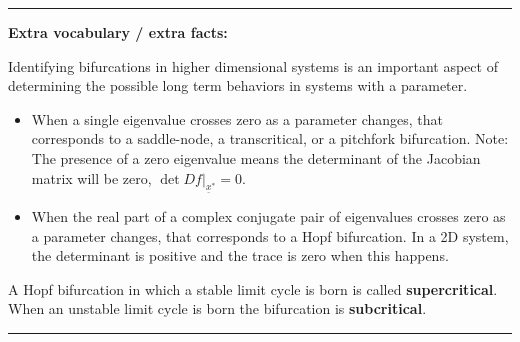 \documentclass[12pt,letterpaper,noanswers]{exam}
\begin{document}
\vspace{0.2cm}
\hrule
\vspace{0.2cm}


\noindent \textbf{Extra vocabulary / extra facts:}
\begin{tcolorbox}
Identifying bifurcations in higher dimensional systems is an important aspect of determining the possible long term behaviors in systems with a parameter.
\begin{itemize}
\itemsep0em
    \item When a single eigenvalue crosses zero as a parameter changes, that corresponds to a saddle-node, a transcritical, or a pitchfork bifurcation.  Note: The presence of a zero eigenvalue means the determinant of the Jacobian matrix will be zero, $\det\left.Df\right\vert_{\underline x^*} = 0$.
    \item When the real part of a complex conjugate pair of eigenvalues crosses zero as a parameter changes, that corresponds to a Hopf bifurcation.  In a 2D system, the determinant is positive and the trace is zero when this happens.
\end{itemize}

A Hopf bifurcation in which a stable limit cycle is born is called \textbf{supercritical}.  When an unstable limit cycle is born the bifurcation is \textbf{subcritical}.
\end{tcolorbox}

\vspace{0.2cm}

\hrule
\vspace{0.2cm}
\end{document}
